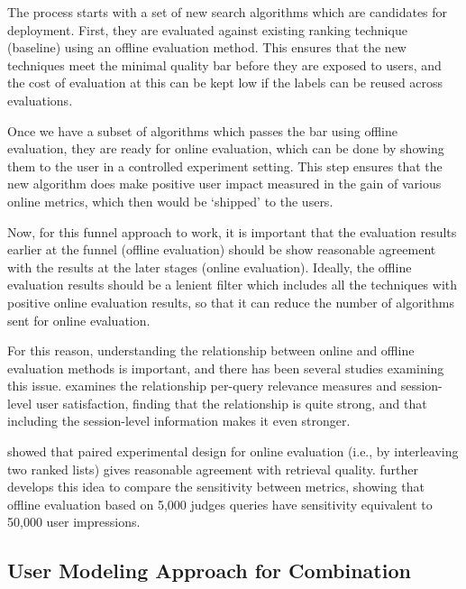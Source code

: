 The process starts with a set of new search algorithms which are candidates for deployment. First, they are evaluated against existing ranking technique (baseline) using an offline evaluation method. This ensures that the new techniques meet the minimal quality bar before they are exposed to users, and the cost of evaluation at this can be kept low if the labels can be reused across evaluations.

Once we have a subset of algorithms which passes the bar using offline evaluation, they are ready for online evaluation, which can be done by showing them to the user in a controlled experiment setting. This step ensures that the new algorithm does make positive user impact measured in the gain of various online metrics, which then would be `shipped' to the users. 

Now, for this funnel approach to work, it is important that the evaluation results earlier at the funnel (offline evaluation) should be show reasonable agreement with the results at the later stages (online evaluation). Ideally, the offline evaluation results should be a lenient filter which includes all the techniques with positive online evaluation results, so that it can reduce the number of algorithms sent for online evaluation.

For this reason, understanding the relationship between online and offline evaluation methods is important, and there has been several studies examining this issue. \cite{Huffman:2007} examines the relationship per-query relevance measures and session-level user satisfaction, finding that the relationship is quite strong, and that including the session-level information makes it even stronger. 

\cite{Radlinski:2008} showed that paired experimental design for online evaluation (i.e., by interleaving two ranked lists) gives reasonable agreement with retrieval quality. \cite{radl:comp10} further develops this idea to compare the sensitivity between metrics, showing that offline evaluation based on 5,000 judges queries have sensitivity equivalent to 50,000 user impressions.

\subsection{User Modeling Approach for Combination}

